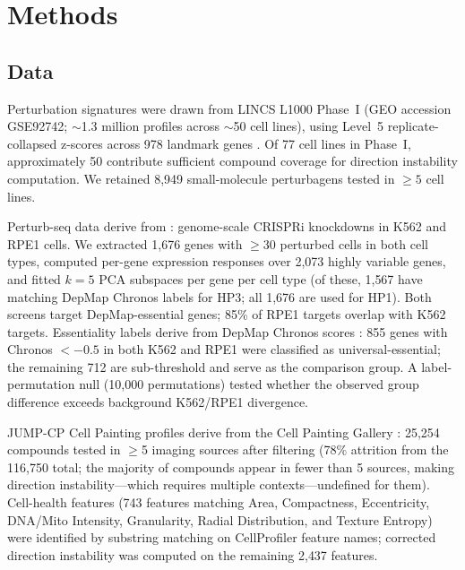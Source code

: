 \documentclass[11pt]{article}
\begin{document}
\section{Methods}

\subsection{Data}

Perturbation signatures were drawn from LINCS L1000 Phase~I (GEO accession
GSE92742; $\sim$1.3 million profiles across $\sim$50 cell lines),
using Level~5 replicate-collapsed z-scores across 978 landmark genes
\citep{subramanian2017next,keenan2018library}. Of 77 cell lines in Phase~I,
approximately 50 contribute sufficient compound coverage for direction
instability computation. We retained 8{,}949
small-molecule perturbagens tested in $\geq5$ cell lines.

Perturb-seq data derive from \citet{replogle2022mapping}: genome-scale
CRISPRi knockdowns in K562 and RPE1 cells. We extracted 1{,}676 genes
with $\geq$30 perturbed cells in both cell types, computed per-gene
expression responses over 2{,}073 highly variable genes, and fitted
$k = 5$ PCA subspaces per gene per cell type (of these, 1{,}567 have
matching DepMap Chronos labels for HP3; all 1{,}676 are used for HP1).
Both screens target DepMap-essential genes; 85\% of RPE1 targets overlap
with K562 targets. Essentiality labels derive from DepMap Chronos scores
\citep{dempster2021chronos}: 855 genes with Chronos $< -0.5$ in both
K562 and RPE1 were classified as universal-essential; the remaining 712
are sub-threshold and serve as the comparison group. A label-permutation
null (10{,}000 permutations) tested whether the observed group difference
exceeds background K562/RPE1 divergence.

JUMP-CP Cell Painting profiles derive from the Cell Painting Gallery
\citep{chandrasekaran2023jump}: 25{,}254 compounds tested in $\geq$5
imaging sources after filtering (78\% attrition from the 116{,}750
total; the majority of compounds appear in fewer than 5 sources,
making direction instability---which requires multiple
contexts---undefined for them). Cell-health features (743 features matching Area,
Compactness, Eccentricity, DNA/Mito Intensity, Granularity, Radial
Distribution, and Texture Entropy) were identified by substring matching
on CellProfiler feature names; corrected direction instability was computed
on the remaining 2{,}437 features.
\end{document}
